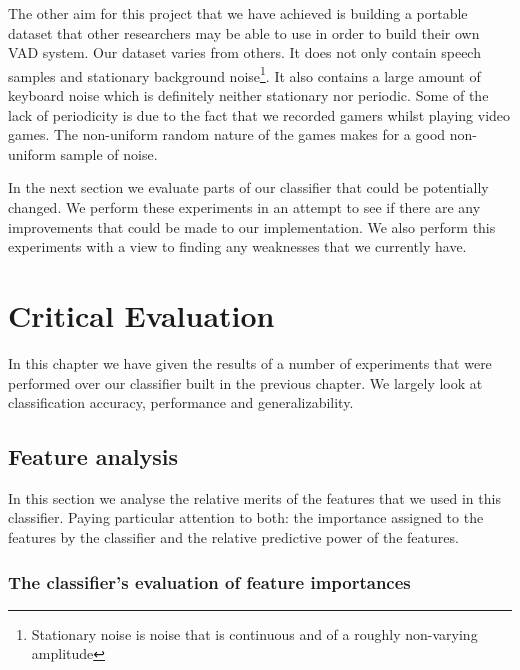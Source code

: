 \documentclass[ %
                    author={Sam Phippen},
                supervisor={Dr. Rafal Bogacz},
                     title={Real time voice activity detectors in noisy personal computing environments},
                  subtitle={},
                    degree={MEng},
                      year={2012} ]{thesis}
\begin{document}
The other aim for this project that we have achieved is building a portable
dataset that other researchers may be able to use in order to build their own
VAD system. Our dataset varies from others. It does not only contain speech
samples and stationary background noise\footnote{Stationary noise is noise that
is continuous and of a roughly non-varying amplitude}. It also contains a large
amount of keyboard noise which is definitely neither stationary nor periodic.
Some of the lack of periodicity is due to the fact that we recorded gamers
whilst playing video games. The non-uniform random nature of the games makes
for a good non-uniform sample of noise.

In the next section we evaluate parts of our classifier that could be
potentially changed. We perform these experiments in an attempt to see if there
are any improvements that could be made to our implementation. We also perform
this experiments with a view to finding any weaknesses that we currently have.


\chapter{Critical Evaluation}
\label{chap:evaluation}

\vspace{1cm}

In this chapter we have given the results of a number of experiments that were
performed over our classifier built in the previous chapter. We largely look at
classification accuracy, performance and generalizability.

\section{Feature analysis}

In this section we analyse the relative merits of the features that we used in
this classifier. Paying particular attention to both: the importance assigned
to the features by the classifier and the relative predictive power of the
features.

\subsection{The classifier's evaluation of feature importances}
\end{document}
